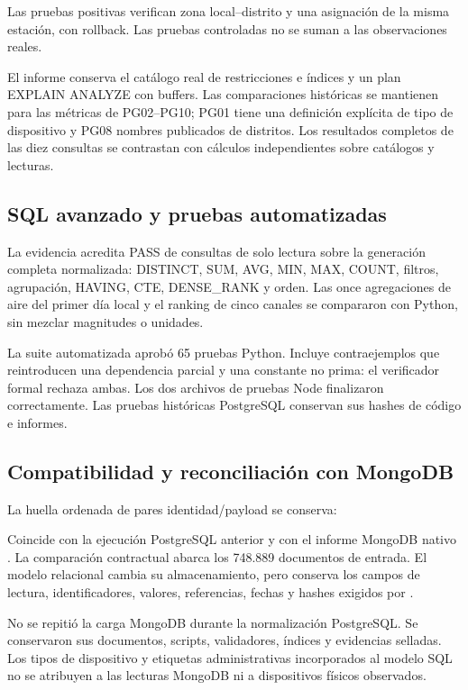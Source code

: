 Las pruebas positivas verifican zona local--distrito
y una asignación de la misma estación, con rollback. Las pruebas controladas
no se suman a las observaciones reales.

El informe conserva el catálogo real de restricciones e índices y un plan
EXPLAIN ANALYZE con buffers. Las comparaciones históricas se mantienen para las
métricas de PG02--PG10; PG01 tiene una definición explícita de tipo de dispositivo
y PG08 nombres publicados de distritos. Los resultados completos de las diez
consultas se contrastan con cálculos independientes sobre catálogos y lecturas.

\subsection{SQL avanzado y pruebas automatizadas}
La evidencia  acredita PASS de
consultas de solo lectura sobre la generación completa normalizada: DISTINCT,
SUM, AVG, MIN, MAX, COUNT, filtros, agrupación, HAVING, CTE, DENSE\_RANK y orden.
Las once agregaciones de aire del primer día local y el ranking de cinco canales
se compararon con Python, sin mezclar magnitudes o unidades.

La suite automatizada aprobó 65 pruebas Python. Incluye contraejemplos que
reintroducen una dependencia parcial y una constante no prima: el verificador
formal rechaza ambas. Los dos archivos de pruebas Node finalizaron correctamente.
Las pruebas históricas PostgreSQL conservan sus hashes de código e informes.

\subsection{Compatibilidad y reconciliación con MongoDB}
La huella ordenada de pares identidad/payload se conserva:
\begin{center}
\small{}
\end{center}
Coincide con la ejecución PostgreSQL anterior y con el informe MongoDB nativo
. La comparación contractual abarca los
748.889 documentos de entrada. El modelo relacional cambia su almacenamiento,
pero conserva los campos de lectura, identificadores, valores, referencias,
fechas y hashes exigidos por .

No se repitió la carga MongoDB durante la normalización PostgreSQL. Se conservaron
sus documentos, scripts, validadores, índices y evidencias selladas. Los tipos de
dispositivo y etiquetas administrativas incorporados al modelo SQL no se atribuyen
a las lecturas MongoDB ni a dispositivos físicos observados.

